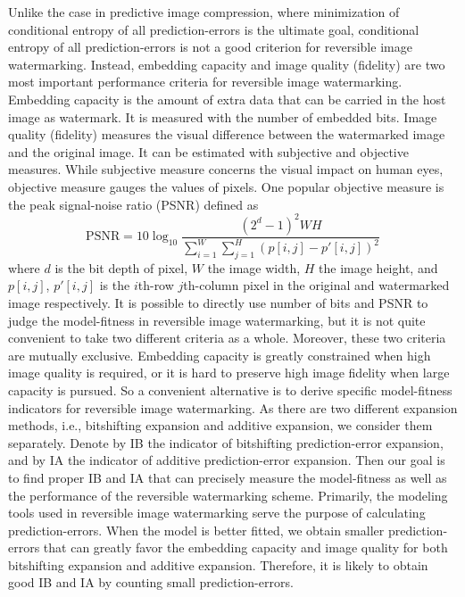 \documentclass[journal]{IEEEtran}
\begin{document}
Unlike the case in predictive image compression, where minimization of conditional entropy of all
prediction-errors is the ultimate goal, conditional entropy of all prediction-errors is not a good
criterion for reversible image watermarking. Instead, embedding capacity and image quality
(fidelity) are two most important performance criteria for reversible image watermarking. Embedding
capacity is the amount of extra data that can be carried in the host image as watermark. It is
measured with the number of embedded bits. Image quality (fidelity) measures the visual difference
between the watermarked image and the original image. It can be estimated with subjective and
objective measures. While subjective measure concerns the visual impact on human eyes, objective
measure gauges the values of pixels. One popular objective measure is the peak signal-noise
ratio (PSNR) defined as 
\begin{equation}\label{eqn:psnr}
  \mbox{PSNR} = 10\log_{10} \frac{(2^d-1)^2WH}{\sum_{i=1}^W \sum_{j=1}^H (p[i,j]-p'[i,j])^2} 
\end{equation}
where $d$ is the bit depth of pixel, $W$ the image width, $H$ the image height, and $p[i,j]$, 
$p'[i,j]$ is the $i$th-row $j$th-column pixel in the original and watermarked image respectively. It
is possible to directly use number of bits and PSNR to judge the model-fitness in reversible image
watermarking, but it is not quite convenient to take two different criteria as a whole. Moreover,
these two criteria are mutually exclusive. Embedding capacity is greatly constrained when high image
quality is required, or it is hard to preserve high image fidelity when large capacity is pursued.
So a convenient alternative is to derive specific model-fitness indicators for reversible image
watermarking. As there are two different expansion methods, i.e., bitshifting expansion and additive
expansion, we consider them separately. Denote by IB the indicator of bitshifting prediction-error
expansion, and by IA the indicator of additive prediction-error expansion. Then our goal is to find
proper IB and IA that can precisely measure the model-fitness as well as the performance of the
reversible watermarking scheme. Primarily, the modeling tools used in reversible image watermarking
serve the purpose of calculating prediction-errors. When the model is better fitted, we obtain
smaller prediction-errors that can greatly favor the embedding capacity and image quality for both
bitshifting expansion and additive expansion. Therefore, it is likely to obtain good IB and IA by
counting small prediction-errors. 
\end{document}
